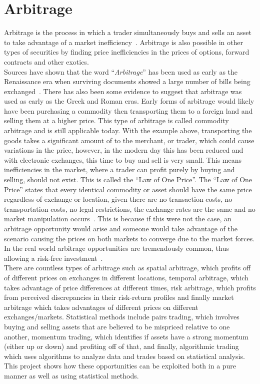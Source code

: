 \section{Arbitrage}
Arbitrage is the process in which a trader simultaneously buys and sells an asset to take advantage of a market inefficiency~\cite{businessinsightsblog_2021}. Arbitrage is also possible in other types of securities by finding price inefficiencies in the prices of options, forward contracts and other exotics.
\\[3mm]
Sources have shown that the word ``\textit{Arbitrage}'' has been used as early as the Renaissance era when surviving documents showed a large number of bills being exchanged~\cite{poitras_2021}. There has also been some evidence to suggest that arbitrage was used as early as the Greek and Roman eras. Early forms of arbitrage would likely have been purchasing a commodity then transporting them to a foreign land and selling them at a higher price. This type of arbitrage is called commodity arbitrage and is still applicable today. With the example above, transporting the goods takes a significant amount of to the merchant, or trader, which could cause variations in the price, however, in the modern day this has been reduced and with electronic exchanges, this time to buy and sell is very small. This means inefficiencies in the market, where a trader can profit purely by buying and selling, should not exist. This is called the ``Law of One Price''. The ``Law of One Price'' states that every identical commodity or asset should have the same price regardless of exchange or location, given there are no transaction costs, no transportation costs, no legal restrictions, the exchange rates are the same and no market manipulation occurs~\cite{noauthor_law_nodate}. This is because if this were not the case, an arbitrage opportunity would arise and someone would take advantage of the scenario causing the prices on both markets to converge due to the market forces. In the real world arbitrage opportunities are tremendously common, thus allowing a risk-free investment~\cite{10.2307/1828075, RICHARDSON1978341}.
\\[3mm]
There are countless types of arbitrage such as spatial arbitrage, which profits off of different prices on exchanges in different locations, temporal arbitrage, which takes advantage of price differences at different times, risk arbitrage, which profits from perceived discrepancies in their risk-return profiles and finally market arbitrage which takes advantages of different prices on different exchanges/markets. Statistical methods include pairs trading, which involves buying and selling assets that are believed to be mispriced relative to one another, momentum trading, which identifies if assets have a strong momentum (either up or down) and profiting off of that, and finally, algorithmic trading which uses algorithms to analyze data and trades based on statistical analysis. This project shows how these opportunities can be exploited both in a pure manner as well as using statistical methods.

